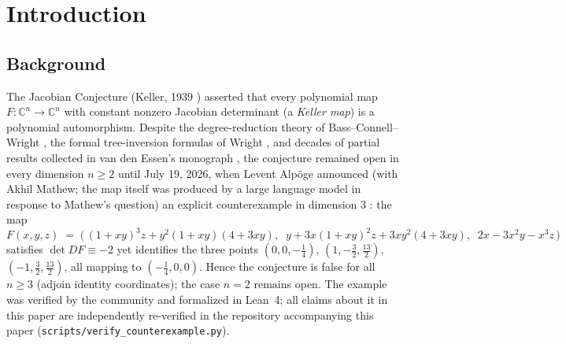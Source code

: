\documentclass[11pt]{article}
\theoremstyle{definition}
\theoremstyle{remark}
\newcommand{\C}{\mathbb{C}}
\begin{document}
\begin{abstract}
homotopy-continuation computation shows that the real chamber
function of the two-site lattice deformation remains non-constant at
every probed kinetic coupling --- wall-crossing survives kinetic
mixing, with escape real but pointwise on the probed segment and all
chamber walls fold-type (exact) --- and in the
finite-mode $D=1$ Mathai--Quillen model the index jump survives the
path measure exactly (the mode determinant is a positive spectator);
(ix)~the 0D
Buchholz--Fredenhagen caricature is carried out (split verdict):
causal factorization is provably vacuous, but the dynamical relation
forces the bundle of fiber algebras in which wall, sheet count, and
$S_3$ holonomy have exact algebraic addresses. We state
honestly what the model does \emph{not} imply (nothing about UV
renormalization, Borel summability, or $D=4$ existence). AI-assisted
exploratory research, not peer reviewed; every claim is labelled exact,
box-checked, or open, and is reproducible from a cited script.
\end{abstract}

\tableofcontents

\section{Introduction}

\subsection{Background}

The Jacobian Conjecture (Keller, 1939 \cite{Kel39}) asserted that every
polynomial map $F:\C^n\to\C^n$ with constant nonzero Jacobian determinant
(a \emph{Keller map}) is a polynomial automorphism. Despite the
degree-reduction theory of Bass--Connell--Wright \cite{BCW82}, the formal
tree-inversion formulas of Wright \cite{Wri87}, and decades of partial
results collected in van den Essen's monograph \cite{vdE00}, the
conjecture remained open in every dimension $n\ge 2$ until July 19, 2026,
when Levent Alp\"oge announced (with Akhil Mathew; the map itself was
produced by a large language model in response to Mathew's question) an
explicit counterexample in dimension $3$ \cite{AM26}: the map
\begin{equation}\label{eq:AM}
F(x,y,z) \;=\; \bigl(\,(1+xy)^3 z + y^2(1+xy)(4+3xy),\;\;
 y + 3x(1+xy)^2 z + 3xy^2(4+3xy),\;\;
 2x - 3x^2y - x^3 z\,\bigr)
\end{equation}
satisfies $\det DF \equiv -2$ yet identifies the three points
$(0,0,-\tfrac14)$, $(1,-\tfrac32,\tfrac{13}{2})$,
$(-1,\tfrac32,\tfrac{13}{2})$, all mapping to $(-\tfrac14,0,0)$. Hence
the conjecture is false for all $n\ge 3$ (adjoin identity coordinates);
the case $n=2$ remains open. The example was verified by the community
and formalized in Lean~4; all claims about it in this paper are
independently re-verified in the repository accompanying this paper
(\texttt{scripts/verify\_counterexample.py}).
\end{document}
